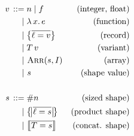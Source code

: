 \begin{align*}
\graintro v
n \mid f   
& \text{(integer, float)}
\graitem
\slam{x}{e} 
& \text{(function)}
\graitem
\srecordval{\overline{\ell = v}} 
& \text{(record)} 
\graitem
\stag{T}{v} & \text{(variant)} \\ \mid&\,\,
\sarrayval{\vess}{I} & \text{(array)} \\ \mid&\,\,
\vess & \text{(shape value)} 
\\ \\
\graintro{\vess}
\ssize{n} 
& \text{(sized shape)}
\graitem
\sproductval{\overline{ \ell = \vess }} 
& \text{(product shape)}
\graitem
\sconcatval{\overline{ T = \vess }} 
& \text{(concat. shape)}
\end{align*}